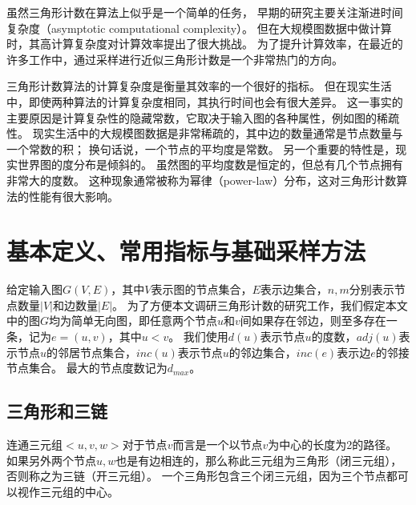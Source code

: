虽然三角形计数在算法上似乎是一个简单的任务，
早期的研究主要关注渐进时间复杂度（asymptotic computational complexity）\citep{itai1978finding, alon1997finding}。
但在大规模图数据中做计算时，其高计算复杂度对计算效率提出了很大挑战。
为了提升计算效率，在最近的许多工作中，通过采样进行近似三角形计数是一个非常热门的方向\citep{tsourakakis2008fast,rahman2014sampling,rahman2013approximate,tsourakakis2009doulion,jha2015space,seshadhri2013triadic}。

三角形计数算法的计算复杂度是衡量其效率的一个很好的指标。
但在现实生活中，即使两种算法的计算复杂度相同，其执行时间也会有很大差异。
这一事实的主要原因是计算复杂性的隐藏常数，它取决于输入图的各种属性，例如图的稀疏性。
现实生活中的大规模图数据是非常稀疏的，其中边的数量通常是节点数量与一个常数的积；
换句话说，一个节点的平均度是常数。
另一个重要的特性是，现实世界图的度分布是倾斜的。
虽然图的平均度数是恒定的，但总有几个节点拥有非常大的度数。
这种现象通常被称为幂律（power-law）分布\citep{barabasi1999emergence}，这对三角形计数算法的性能有很大影响。

\chapter{基本定义、常用指标与基础采样方法}

给定输入图$G(V,E)$，其中$V$表示图的节点集合，$E$表示边集合，$n,m$分别表示节点数量$|V|$和边数量$|E|$。
为了方便本文调研三角形计数的研究工作，我们假定本文中的图$G$均为简单无向图，即任意两个节点$u$和$v$间如果存在邻边，则至多存在一条，记为$e=(u,v)$，其中$u < v$。
我们使用$d(u)$表示节点$u$的度数，$adj(u)$表示节点$u$的邻居节点集合，$inc(u)$表示节点$u$的邻边集合，$inc(e)$表示边$e$的邻接节点集合。
最大的节点度数记为$d_{max}$。

\section{三角形和三链}

连通三元组$<u,v,w>$对于节点$v$而言是一个以节点$v$为中心的长度为2的路径。
如果另外两个节点$u,w$也是有边相连的，那么称此三元组为三角形（闭三元组），否则称之为三链（开三元组）。
一个三角形包含三个闭三元组，因为三个节点都可以视作三元组的中心。

